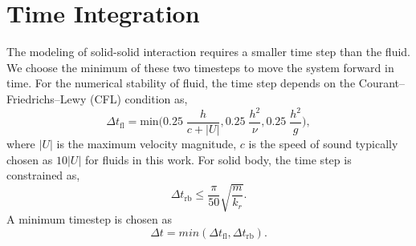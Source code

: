 \documentclass[preprint,12pt]{elsarticle}
\begin{document}
\FloatBarrier%
\section{Time Integration}
\label{sec:integration}

The modeling of solid-solid interaction requires a smaller time step than the
fluid. We choose the minimum of these two timesteps to move the system forward
in time. For the numerical stability of fluid, the time step depends on the
Courant–Friedrichs–Lewy (CFL) condition \cite{monaghan-review:2005} as,
\begin{equation}
  \label{eq:rfc:time-step-cfl}
  \Delta t_{\text{fl}} = \mathrm{min} \bigg( 0.25 \; \frac{h}{c + |U|} ,  0.25 \; \frac{h^2}{\nu},  0.25 \; \frac{h^2}{g} \bigg),
\end{equation}
where $|U|$ is the maximum velocity magnitude, $c$ is the speed of sound
typically chosen as $10 |U|$ for fluids in this work. For solid body, the time
step is constrained \cite{cundall_discrete_1979} as,
\begin{equation}
  \label{eq:rfc:time-step-body-force}
  \Delta t_{\text{rb}} \leq \frac{\pi}{50} \sqrt{\frac{m}{k_r}}.
\end{equation}
A minimum timestep is chosen as
\begin{equation}
  \label{eq:rfc:time-step-body-force}
  \Delta t = min(\Delta t_{\text{fl}}, \Delta t_{\text{rb}}).
\end{equation}
\end{document}
